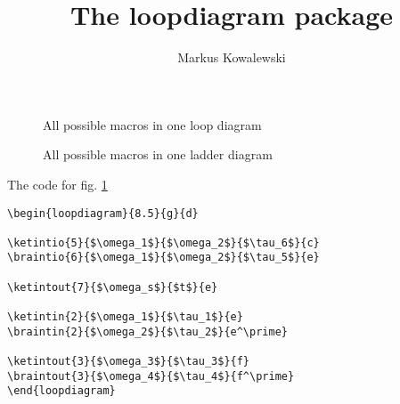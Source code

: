 \documentclass[12pt,letterpaper]{article}
\title{The loopdiagram package}
\author{Markus Kowalewski}
\begin{document}
\maketitle

\begin{figure}
\centering
{}
\caption{All possible macros in one loop diagram}
\label{fig:diagall}
\end{figure}

\begin{figure}
\centering
{}
\caption{All possible macros in one ladder diagram}
\label{fig:ldiagall}
\end{figure}

The code for fig. \ref{fig:diagall}
\begin{verbatim}
\begin{loopdiagram}{8.5}{g}{d}

\ketintio{5}{$\omega_1$}{$\omega_2$}{$\tau_6$}{c}
\braintio{6}{$\omega_1$}{$\omega_2$}{$\tau_5$}{e}

\ketintout{7}{$\omega_s$}{$t$}{e}

\ketintin{2}{$\omega_1$}{$\tau_1$}{e}
\braintin{2}{$\omega_2$}{$\tau_2$}{e^\prime}

\ketintout{3}{$\omega_3$}{$\tau_3$}{f}
\braintout{3}{$\omega_4$}{$\tau_4$}{f^\prime}
\end{loopdiagram}
\end{verbatim}

\begin{leveldiagram}{5}{8}


\end{leveldiagram}
\end{document}
